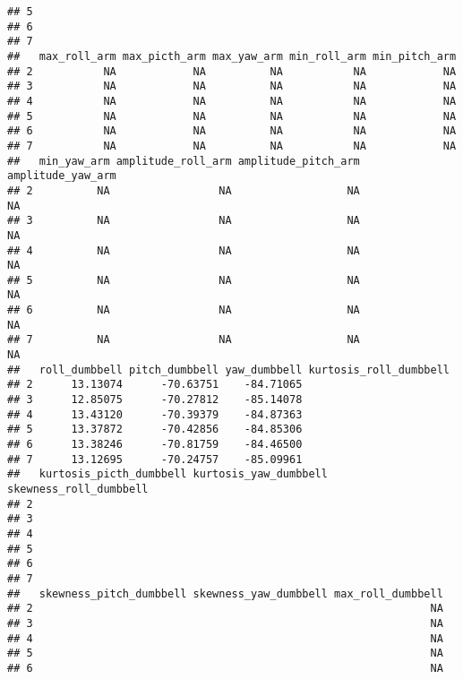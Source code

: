 \documentclass[]{article}
\begin{document}
\begin{verbatim}
## 5                                                                       
## 6                                                                       
## 7                                                                       
##   max_roll_arm max_picth_arm max_yaw_arm min_roll_arm min_pitch_arm
## 2           NA            NA          NA           NA            NA
## 3           NA            NA          NA           NA            NA
## 4           NA            NA          NA           NA            NA
## 5           NA            NA          NA           NA            NA
## 6           NA            NA          NA           NA            NA
## 7           NA            NA          NA           NA            NA
##   min_yaw_arm amplitude_roll_arm amplitude_pitch_arm amplitude_yaw_arm
## 2          NA                 NA                  NA                NA
## 3          NA                 NA                  NA                NA
## 4          NA                 NA                  NA                NA
## 5          NA                 NA                  NA                NA
## 6          NA                 NA                  NA                NA
## 7          NA                 NA                  NA                NA
##   roll_dumbbell pitch_dumbbell yaw_dumbbell kurtosis_roll_dumbbell
## 2      13.13074      -70.63751    -84.71065                       
## 3      12.85075      -70.27812    -85.14078                       
## 4      13.43120      -70.39379    -84.87363                       
## 5      13.37872      -70.42856    -84.85306                       
## 6      13.38246      -70.81759    -84.46500                       
## 7      13.12695      -70.24757    -85.09961                       
##   kurtosis_picth_dumbbell kurtosis_yaw_dumbbell skewness_roll_dumbbell
## 2                                                                     
## 3                                                                     
## 4                                                                     
## 5                                                                     
## 6                                                                     
## 7                                                                     
##   skewness_pitch_dumbbell skewness_yaw_dumbbell max_roll_dumbbell
## 2                                                              NA
## 3                                                              NA
## 4                                                              NA
## 5                                                              NA
## 6                                                              NA

\end{verbatim}
\end{document}
